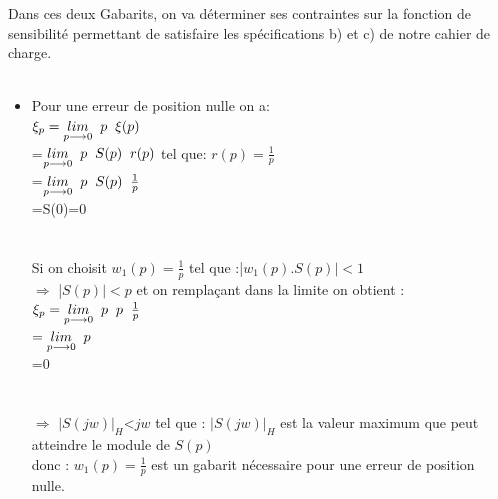 \documentclass[12pt, a4paper, openany]{report}
\begin{document}
 Dans ces deux Gabarits, on va déterminer ses contraintes sur la fonction de sensibilité permettant de satisfaire les spécifications b) et c) de notre cahier de charge.\\[0.1cm]\\
 \begin{itemize}[label=,font=\small\color{black}]
\item Pour une erreur de position nulle on a:\\
$\xi_{p}= \underset{p\longrightarrow 0}{lim}\hspace{2mm} p\hspace{2mm}\xi(p)$ \\
        =$\underset{p\longrightarrow 0}{lim}\hspace{2mm} p\hspace{2mm} S(p)\hspace{2mm} r(p)$ \hspace{2cm} tel que: \hspace{0.5cm}$r(p)=\frac {1}{p}$ \\
        =$\underset{p\longrightarrow 0}{lim}\hspace{2mm} p\hspace{2mm} S(p)\hspace{2mm} \frac {1}{p} $\\ 
        =S(0)=0\\
        \\[1mm]\\
        Si on choisit $w_{1}(p)=\frac {1}{p} $ \hspace{1cm} tel que :\hspace{2mm}|$w_{1}(p).S(p)|<1$\\
        $\Rightarrow$ |$S(p)|<p$ \hspace{3mm} et on remplaçant dans la limite on obtient : \\ 
        $\xi_{p}=\underset{p\longrightarrow 0}{lim}\hspace{2mm} p\hspace{2mm} p \hspace{2mm} \frac {1}{p} $\\
        $=\underset{p\longrightarrow 0}{lim}\hspace{2mm} p\hspace{2mm}$\\
        =\hspace{2mm}0  \\
        \\[0.5cm]\\
       $\Rightarrow$  \hspace{2mm} $|S(jw)|_{H}$<$jw$  \hspace{2mm} tel que : $|S(jw)|_{H}$ est la valeur maximum que peut atteindre le module de $S(p)$ \\
       donc : $w_{1}(p)=\frac {1}{p} $ \hspace{2mm} est un gabarit nécessaire pour une erreur de position nulle.\\
  \end{itemize}
\end{document}
